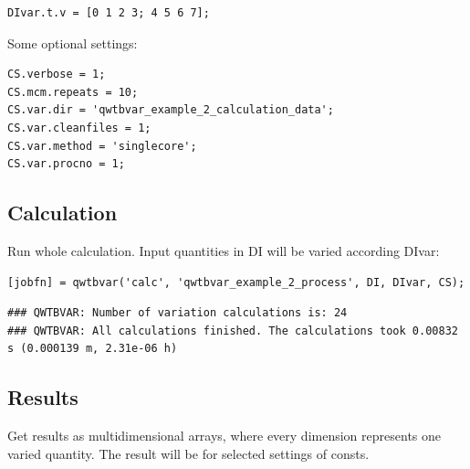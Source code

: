 \begin{lstlisting}
DIvar.t.v = [0 1 2 3; 4 5 6 7];
\end{lstlisting}


Some optional settings:

\begin{lstlisting}
CS.verbose = 1;
CS.mcm.repeats = 10;
CS.var.dir = 'qwtbvar_example_2_calculation_data';
CS.var.cleanfiles = 1;
CS.var.method = 'singlecore';
CS.var.procno = 1;
\end{lstlisting}


{}
\subsection*{Calculation}



Run whole calculation. Input quantities in DI will be varied according DIvar:

\begin{lstlisting}
[jobfn] = qwtbvar('calc', 'qwtbvar_example_2_process', DI, DIvar, CS);
\end{lstlisting}
\begin{lstlisting}[language={},xleftmargin=5pt,frame=none]
### QWTBVAR: Number of variation calculations is: 24
### QWTBVAR: All calculations finished. The calculations took 0.00832 s (0.000139 m, 2.31e-06 h)

\end{lstlisting}


{}
\subsection*{Results}



Get results as multidimensional arrays, where every dimension represents one
varied quantity. The result will be for selected settings of consts.

